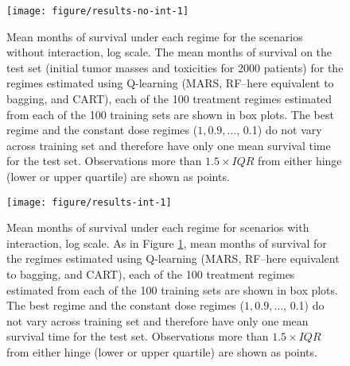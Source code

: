 \documentclass[12pt]{article}
\begin{document}
\begin{figure}[!htbp]
  \centering
  \texttt{[image: figure/results-no-int-1]}
  \caption[Mean months of survival under each regime for scenarios without interaction]{Mean months of survival under each regime for the scenarios without interaction, log scale. The mean months of survival on the test set (initial tumor masses and toxicities for 2000 patients) for the regimes estimated using Q-learning (MARS, RF--here equivalent to bagging, and CART), each of the 100 treatment regimes estimated from each of the 100 training sets are shown in box plots. The best regime and the constant dose regimes ($1, 0.9, \ldots$, 0.1) do not vary across training set and therefore have only one mean survival time for the test set. Observations more than $1.5 \times IQR$ from either hinge (lower or upper quartile) are shown as points.}\label{fig:results-no-int}
\end{figure}

\begin{figure}[!htbp]
  \centering
  \texttt{[image: figure/results-int-1]}
  \caption[Mean months of survival under each regime for scenarios with interaction]{Mean months of survival under each regime for scenarios with interaction, log scale. As in Figure \ref{fig:results-no-int}, mean months of survival for the regimes estimated using Q-learning (MARS, RF--here equivalent to bagging, and CART), each of the 100 treatment regimes estimated from each of the 100 training sets are shown in box plots. The best regime and the constant dose regimes ($1, 0.9, \ldots$, 0.1) do not vary across training set and therefore have only one mean survival time for the test set. Observations more than $1.5 \times IQR$ from either hinge (lower or upper quartile) are shown as points.}\label{fig:results-int}
\end{figure}
\end{document}
